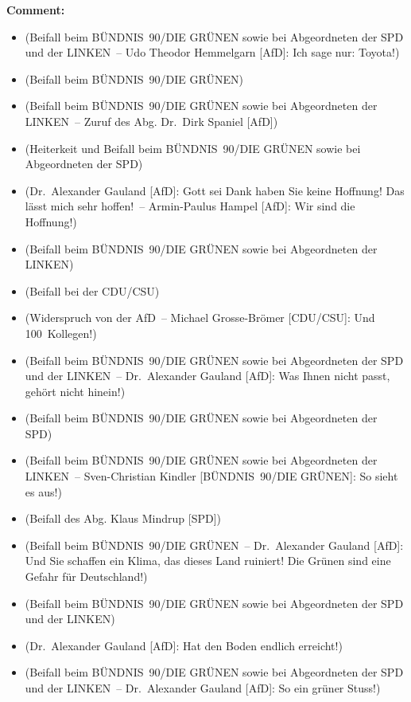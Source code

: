 \documentclass{article}
\begin{document}
\noindent\textbf{Comment:}
\begin{itemize}
    \setlength\itemsep{-3pt}
    \item (Beifall beim BÜNDNIS 90/DIE GRÜNEN sowie bei Abgeordneten der SPD und der LINKEN – Udo Theodor Hemmelgarn [AfD]: Ich sage nur: Toyota!)
    \setlength\itemsep{-3pt}
    \item (Beifall beim BÜNDNIS 90/DIE GRÜNEN)
    \setlength\itemsep{-3pt}
    \item (Beifall beim BÜNDNIS 90/DIE GRÜNEN sowie bei Abgeordneten der LINKEN – Zuruf des Abg. Dr. Dirk Spaniel [AfD])
    \setlength\itemsep{-3pt}
    \item (Heiterkeit und Beifall beim BÜNDNIS 90/DIE GRÜNEN sowie bei Abgeordneten der SPD)
    \setlength\itemsep{-3pt}
    \item (Dr. Alexander Gauland [AfD]: Gott sei Dank haben Sie keine Hoffnung! Das lässt mich sehr hoffen! – Armin-Paulus Hampel [AfD]: Wir sind die Hoffnung!)
    \setlength\itemsep{-3pt}
    \item (Beifall beim BÜNDNIS 90/DIE GRÜNEN sowie bei Abgeordneten der LINKEN)
    \setlength\itemsep{-3pt}
    \item (Beifall bei der CDU/CSU)
    \setlength\itemsep{-3pt}
    \item (Widerspruch von der AfD – Michael Grosse-­Brömer [CDU/CSU]: Und 100 Kollegen!)
    \setlength\itemsep{-3pt}
    \item (Beifall beim BÜNDNIS 90/DIE GRÜNEN sowie bei Abgeordneten der SPD und der LINKEN – Dr. Alexander Gauland [AfD]: Was Ihnen nicht passt, gehört nicht hinein!)
    \setlength\itemsep{-3pt}
    \item (Beifall beim BÜNDNIS 90/DIE GRÜNEN sowie bei Abgeordneten der SPD)
    \setlength\itemsep{-3pt}
    \item (Beifall beim BÜNDNIS 90/DIE GRÜNEN sowie bei Abgeordneten der LINKEN – Sven-Christian Kindler [BÜNDNIS 90/DIE GRÜNEN]: So sieht es aus!)
    \setlength\itemsep{-3pt}
    \item (Beifall des Abg. Klaus Mindrup [SPD])
    \setlength\itemsep{-3pt}
    \item (Beifall beim BÜNDNIS 90/DIE GRÜNEN – Dr. Alexander Gauland [AfD]: Und Sie schaffen ein Klima, das dieses Land ruiniert! Die Grünen sind eine Gefahr für Deutschland!)
    \setlength\itemsep{-3pt}
    \item (Beifall beim BÜNDNIS 90/DIE GRÜNEN sowie bei Abgeordneten der SPD und der LINKEN)
    \setlength\itemsep{-3pt}
    \item (Dr. Alexander Gauland [AfD]: Hat den Boden endlich erreicht!)
    \setlength\itemsep{-3pt}
    \item (Beifall beim BÜNDNIS 90/DIE GRÜNEN sowie bei Abgeordneten der SPD und der LINKEN – Dr. Alexander Gauland [AfD]: So ein grüner Stuss!)
\end{itemize}
\end{document}
